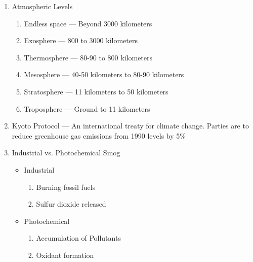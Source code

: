 \documentclass[12pt]{article}
\begin{document}
\begin{enumerate}
\begin{itemize}
    \end{itemize}

  \item Atmospheric Levels

    \begin{enumerate}

      \item Endless space — Beyond 3000 kilometers

      \item Exosphere — 800 to 3000 kilometers

      \item Thermosphere — 80-90 to 800 kilometers

      \item Mesosphere — 40-50 kilometers to 80-90 kilometers

      \item Stratosphere — 11 kilometers to 50 kilometers

      \item Troposphere — Ground to 11 kilometers

    \end{enumerate}

  \item Kyoto Protocol — An international treaty for climate change. Parties are to reduce greenhouse gas emissions from 1990 levels by 5\%

  \item Industrial vs. Photochemical Smog

    \begin{itemize}

      \item Industrial

        \begin{enumerate}

          \item Burning fossil fuels

          \item Sulfur dioxide released

        \end{enumerate}

      \item Photochemical

        \begin{enumerate}

          \item Accumulation of Pollutants

          \item Oxidant formation


\end{enumerate}
\end{itemize}
\end{enumerate}
\end{document}

